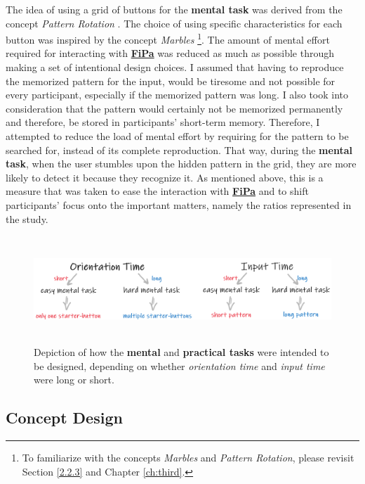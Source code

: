 The idea of using a grid of buttons for the \textbf{mental task} was derived from the concept \textit{Pattern Rotation} \cite{Marbles, anonymous}. The choice of using specific characteristics for each button was inspired by the concept \textit{Marbles} \cite{Marbles, anonymous} \footnote{To familiarize with the concepts \textit{Marbles} and \textit{Pattern Rotation}, please revisit Section \ref{2.2.3} and Chapter \ref{ch:third}.}. The amount of mental effort required for interacting with \underline{\textbf{FiPa}} was reduced as much as possible through making a set of intentional design choices. I assumed that having to reproduce the memorized pattern for the input, would be tiresome and not possible for every participant, especially if the memorized pattern was long. I also took into consideration that the pattern would certainly not be memorized permanently and therefore, be stored in participants' short-term memory. Therefore, I attempted to reduce the load of mental effort by requiring for the pattern to be searched for, instead of its complete reproduction. That way, during the \textbf{mental task}, when the user stumbles upon the hidden pattern in the grid, they are more likely to detect it because they recognize it. As mentioned above, this is a measure that was taken to ease the interaction with \underline{\textbf{FiPa}} and to shift participants' focus onto the important matters, namely the ratios represented in the study.

\begin{figure}[t!]
\centering
\includegraphics[width=13cm, height=4cm]{Chapters/graphics/OriInput.PNG}
\caption{Depiction of how the \textbf{mental} and \textbf{practical tasks} were intended to be designed, depending on whether \textit{orientation time} and \textit{input time} were long or short.}
\label{fig:orientation_input}
\end{figure}

\subsection{Concept Design} \label{4.2.2}

